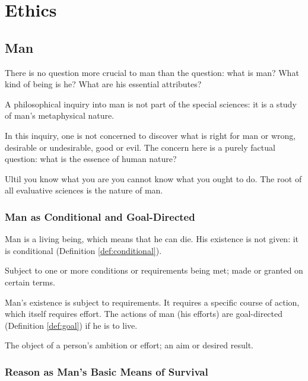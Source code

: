 \part{Ethics}

\chapter{Man}

    There is no question more crucial to man than the question: what is man? What kind of being is he? What are his essential attributes?

    A philosophical inquiry into man is not part of the special sciences: it is a study of man's metaphysical nature.

    In this inquiry, one is not concerned to discover what is right for man or wrong, desirable or undesirable, good or evil. The concern here is a purely factual question: what is the essence of human nature?

    Ultil you know what you are you cannot know what you ought to do. The root of all evaluative sciences is the nature of man.

    \section{Man as Conditional and Goal-Directed}

        Man is a living being, which means that he can die. His existence is not given: it is conditional (Definition \ref{def:conditional}).

            \begin{definition}[Conditional]
            \label{def:conditional}
                Subject to one or more conditions or requirements being met; made or granted on certain terms.
            \end{definition}

        Man's existence is subject to requirements. It requires a specific course of action, which itself requires effort. The actions of man (his efforts) are goal-directed (Definition \ref{def:goal}) if he is to live.

            \begin{definition}[Goal]
            \label{def:goal}
                The object of a person's ambition or effort; an aim or desired result.
            \end{definition}

    \section{Reason as Man's Basic Means of Survival}

